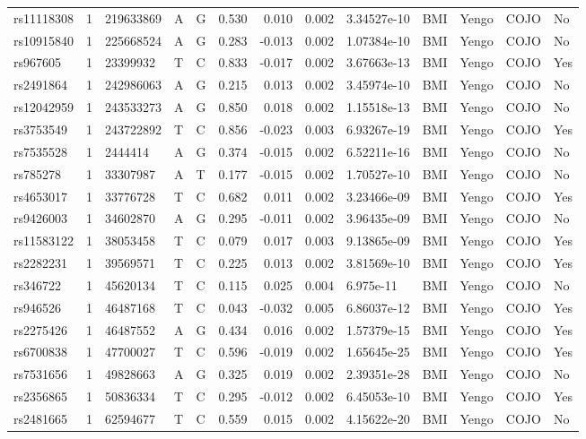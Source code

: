 \documentclass[11pt,twoside]{bristolthesis}
\begin{document}
\begin{longtable}[t]{lrlllrrrlllll}
\addlinespace
rs11118308 & 1 & 219633869 & A & G & 0.530 & 0.010 & 0.002 & 3.34527e-10 & BMI & Yengo & COJO & No\\
rs10915840 & 1 & 225668524 & A & G & 0.283 & -0.013 & 0.002 & 1.07384e-10 & BMI & Yengo & COJO & No\\
rs967605 & 1 & 23399932 & T & C & 0.833 & -0.017 & 0.002 & 3.67663e-13 & BMI & Yengo & COJO & Yes\\
rs2491864 & 1 & 242986063 & A & G & 0.215 & 0.013 & 0.002 & 3.45974e-10 & BMI & Yengo & COJO & No\\
rs12042959 & 1 & 243533273 & A & G & 0.850 & 0.018 & 0.002 & 1.15518e-13 & BMI & Yengo & COJO & No\\
\addlinespace
rs3753549 & 1 & 243722892 & T & C & 0.856 & -0.023 & 0.003 & 6.93267e-19 & BMI & Yengo & COJO & Yes\\
rs7535528 & 1 & 2444414 & A & G & 0.374 & -0.015 & 0.002 & 6.52211e-16 & BMI & Yengo & COJO & No\\
rs785278 & 1 & 33307987 & A & T & 0.177 & -0.015 & 0.002 & 1.70527e-10 & BMI & Yengo & COJO & No\\
rs4653017 & 1 & 33776728 & T & C & 0.682 & 0.011 & 0.002 & 3.23466e-09 & BMI & Yengo & COJO & Yes\\
rs9426003 & 1 & 34602870 & A & G & 0.295 & -0.011 & 0.002 & 3.96435e-09 & BMI & Yengo & COJO & No\\
\addlinespace
rs11583122 & 1 & 38053458 & T & C & 0.079 & 0.017 & 0.003 & 9.13865e-09 & BMI & Yengo & COJO & Yes\\
rs2282231 & 1 & 39569571 & T & C & 0.225 & 0.013 & 0.002 & 3.81569e-10 & BMI & Yengo & COJO & Yes\\
rs346722 & 1 & 45620134 & T & C & 0.115 & 0.025 & 0.004 & 6.975e-11 & BMI & Yengo & COJO & No\\
rs946526 & 1 & 46487168 & T & C & 0.043 & -0.032 & 0.005 & 6.86037e-12 & BMI & Yengo & COJO & Yes\\
rs2275426 & 1 & 46487552 & A & G & 0.434 & 0.016 & 0.002 & 1.57379e-15 & BMI & Yengo & COJO & Yes\\
\addlinespace
rs6700838 & 1 & 47700027 & T & C & 0.596 & -0.019 & 0.002 & 1.65645e-25 & BMI & Yengo & COJO & Yes\\
rs7531656 & 1 & 49828663 & A & G & 0.325 & 0.019 & 0.002 & 2.39351e-28 & BMI & Yengo & COJO & No\\
rs2356865 & 1 & 50836334 & T & C & 0.295 & -0.012 & 0.002 & 6.45053e-10 & BMI & Yengo & COJO & Yes\\
rs2481665 & 1 & 62594677 & T & C & 0.559 & 0.015 & 0.002 & 4.15622e-20 & BMI & Yengo & COJO & No\\

\end{longtable}
\end{document}
